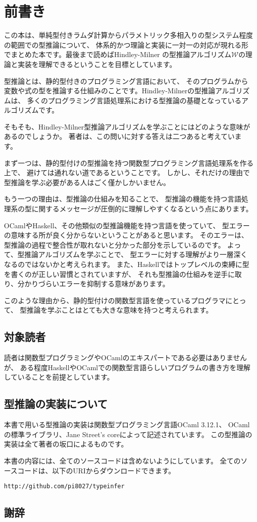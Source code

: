 
\chapter*{前書き}

この本は、単純型付きラムダ計算からパラメトリック多相入りの型システム程度の範囲での型推論について、
体系的かつ理論と実装に一対一の対応が現れる形でまとめた本です。最後まで読めばHindley-Milner
の型推論アルゴリズム$\mathcal W$の理論と実装を理解できるということを目標としています。

型推論とは、静的型付きのプログラミング言語において、
そのプログラムから変数や式の型を推論する仕組みのことです。Hindley-Milnerの型推論アルゴリズムは、
多くのプログラミング言語処理系における型推論の基礎となっているアルゴリズムです。

そもそも、Hindley-Milner型推論アルゴリズムを学ぶことにはどのような意味があるのでしょうか。
著者は、この問いに対する答えは二つあると考えています。

まず一つは、静的型付けの型推論を持つ関数型プログラミング言語処理系を作る上で、
避けては通れない道であるということです。
しかし、それだけの理由で型推論を学ぶ必要がある人はごく僅かしかいません。

もう一つの理由は、型推論の仕組みを知ることで、
型推論の機能を持つ言語処理系の型に関するメッセージが圧倒的に理解しやすくなるという点にあります。

OCamlやHaskell、その他類似の型推論機能を持つ言語を使っていて、
型エラーの意味する所が良く分からないということがあると思います。
そのエラーは、型推論の過程で整合性が取れないと分かった部分を示しているのです。
よって、型推論アルゴリズムを学ぶことで、
型エラーに対する理解がより一層深くなるのではないかと考えられます。
また、Haskellではトップレベルの束縛に型を書くのが正しい習慣とされていますが、
それも型推論の仕組みを逆手に取り、分かりづらいエラーを抑制する意味があります。

このような理由から、静的型付けの関数型言語を使っているプログラマにとって、
型推論を学ぶことはとても大きな意味を持つと考えられます。

\section*{対象読者}

読者は関数型プログラミングやOCamlのエキスパートである必要はありませんが、
ある程度HaskellやOCamlでの関数型言語らしいプログラムの書き方を理解していることを前提としています。

\section*{型推論の実装について}

本書で用いる型推論の実装は関数型プログラミング言語OCaml 3.12.1、
OCamlの標準ライブラリ、Jane Street's coreによって記述されています。
この型推論の実装は全て著者の坂口によるものです。

本書の内容には、全てのソースコードは含めないようにしています。
全てのソースコードは、以下のURIからダウンロードできます。

\texttt{http://github.com/pi8027/typeinfer}

\section*{謝辞}



